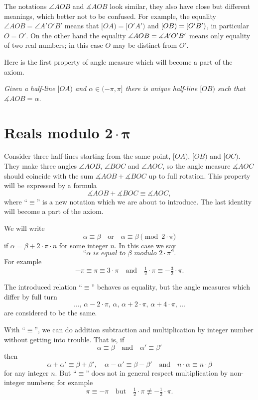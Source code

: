 The notations $\angle AOB$ and $\measuredangle AOB$ look similar,
they also have close but different meanings, 
which better not to be confused.
For example, the equality 
$\angle AOB=\angle A'O'B'$
means that
$[OA)=[O'A')$ and $[OB)\z=[O'B')$,
in particular $O=O'$.
On the other hand the equality 
$\measuredangle AOB\z=\measuredangle A'O'B'$ 
means only equality of two real numbers;
in this case $O$ may be distinct from $O'$.

Here is the first property of angle measure which will become a part of the axiom.

\textit{Given a half-line $[O A)$ and $\alpha\in(-\pi,\pi]$ there is unique  half-line $[O B)$ such that $\measuredangle A O B= \alpha$.}





\section*{Reals modulo $\bm{2\cdot\pi}$}

Consider three half-lines starting from the same point,
 $[O A)$, $[O B)$ and $[O C)$.
They make three angles $\angle A O B$, $\angle B O C$ and $\angle A O C$,
so the angle measure $\measuredangle A O C$ should coincide with
the sum $\measuredangle A O B+\measuredangle B O C$ up to full rotation.
This property will be expressed by a formula 
$$\measuredangle A O B+\measuredangle B O C\equiv \measuredangle A O C,$$
where ``$\equiv$'' is a new notation which we are about to introduce.
The last identity will become a part of the axiom.

We will write 
$$\alpha\equiv\beta
\quad\text{or}
\quad
\alpha\equiv\beta\pmod{2\cdot\pi}$$ 
if $\alpha=\beta+2\cdot\pi\cdot n$
for some integer $n$.
In this case we say 
$$\textit{``$\alpha$ is equal to $\beta$ modulo $2\cdot\pi$''}.$$
For example 
$$-\pi
\equiv
\pi\equiv 3\cdot\pi
\quad
\text{and}
\quad
\tfrac12\cdot\pi
\equiv
-\tfrac32\cdot\pi.$$

The introduced relation ``$\equiv$'' behaves as equality, 
but the angle measures which differ by full turn 
\[\dots,\,\alpha-2\cdot\pi,\, \alpha,\, \alpha+2\cdot\pi,\, \alpha+4\cdot\pi,\,\dots\] 
are considered to be the same.

With ``$\equiv$'', we can do addition subtraction and multiplication by integer number without getting into trouble.
That is, if
$$\alpha\equiv\beta
\quad
\text{and}
\quad
\alpha'\equiv \beta'$$ 
then
$$\alpha+\alpha'\equiv\beta+\beta',
\quad
\alpha-\alpha'\equiv \beta-\beta'
\quad 
\text{and}
\quad
n\cdot\alpha\equiv n\cdot\beta$$
for any integer $n$.
But ``$\equiv$'' does not in general respect multiplication by non-integer numbers; for example 
$$\pi
\equiv 
-\pi
\quad
\text{but}
\quad
\tfrac12\cdot\pi
\not\equiv
-\tfrac12\cdot\pi.$$ 

